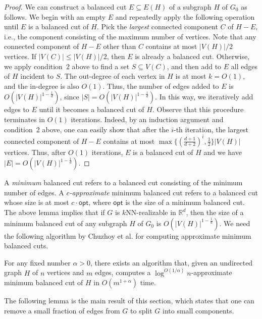 \begin{proof}
We can construct a balanced cut $E \subseteq E(H)$ of a subgraph $H$ of $G_0$ as follows.
We begin with an empty $E$ and repeatedly apply the following operation until $E$ is a balanced cut of $H$.
Pick the \textit{largest} connected component $C$ of $H-E$, i.e., the component consisting of the maximum number of vertices.
Note that any connected component of $H-E$ other than $C$ contains at most $|V(H)|/2$ vertices.
If $|V(C)| \leq |V(H)|/2$, then $E$ is already a balanced cut.
Otherwise, we apply condition~2 above to find a set $S \subseteq V(C)$, and then add to $E$ all edges of $H$ incident to $S$.
The out-degree of each vertex in $H$ is at most $k = O(1)$, and the in-degree is also $O(1)$.
Thus, the number of edges added to $E$ is $O(|V(H)|^{1-\frac{1}{d}})$, since $|S| = O(|V(H)|^{1-\frac{1}{d}})$.
In this way, we iteratively add edges to $E$ until it becomes a balanced cut of $H$.
Observe that this procedure terminates in $O(1)$ iterations.
Indeed, by an induction argument and condition~2 above, one can easily show that after the $i$-th iteration, the largest connected component of $H-E$ contains at most $\max\{(\frac{d+1}{d+2})^i,\frac{1}{2}\} |V(H)|$ vertices.
Thus, after $O(1)$ iterations, $E$ is a balanced cut of $H$ and we have $|E| = O(|V(H)|^{1-\frac{1}{d}})$.
\end{proof}

A \textit{minimum} balanced cut refers to a balanced cut consisting of the minimum number of edges.
A \textit{$c$-approximate} minimum balanced cut refers to a balanced cut whose size is at most $c \cdot \mathsf{opt}$, where $\mathsf{opt}$ is the size of a minimum balanced cut.
The above lemma implies that if $G$ is $k$NN-realizable in $\mathbb{R}^d$, then the size of a minimum balanced cut of any subgraph $H$ of $G_0$ is $O(|V(H)|^{1-\frac{1}{d}})$.
We need the following algorithm by Chuzhoy et al. for computing approximate minimum balanced cuts.
\begin{theorem} \label{thm-cut}
For any fixed number $\alpha > 0$, there exists an algorithm that, given an undirected graph $H$ of $n$ vertices and $m$ edges, computes a $\log^{O(1/\alpha)} n$-approximate minimum balanced cut of $H$ in $O(m^{1+\alpha})$ time.
\end{theorem}

The following lemma is the main result of this section, which states that one can remove a small fraction of edges from $G$ to split $G$ into small components.

